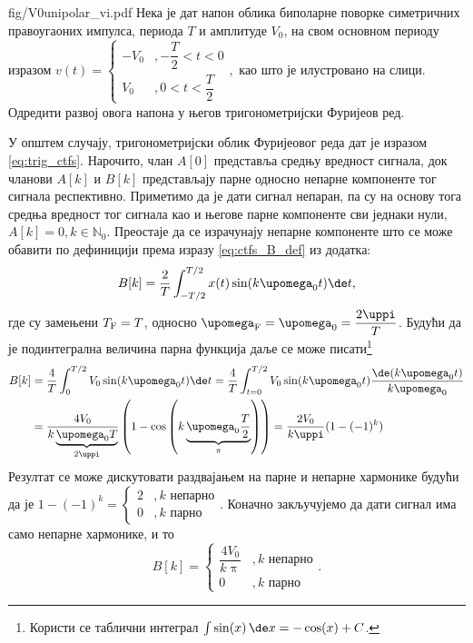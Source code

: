 \noindent\begin{slikaDesno}{fig/V0unipolar_vi.pdf}
\PID \label{z:pravougani_po_def}  Нека је дат напон облика биполарне поворке симетричних правоугаоних импулса, периода $T$ и амплитуде $V_0$, 
на свом основном периоду изразом
$
v(t) = 
\begin{cases}
    -V_0 &, -\dfrac{T}{2} < t < 0 \\[2mm]
    V_0  &, 0 < t < \dfrac{T}{2}
\end{cases},
$ као што је илустровано на слици. Одредити развој овога напона у његов тригонометријски Фуријеов ред.
\end{slikaDesno}
%
\RESENJE
У општем случају, тригонометријски облик Фуријеовог реда дат је изразом \eqref{eq:trig_ctfs}. Нарочито, члан 
$A[0]$ представља средњу вредност сигнала, док чланови $A[k]$ и $B[k]$ представљају парне односно непарне 
компоненте тог сигнала респективно. Приметимо да је дати сигнал непаран, па су на основу тога средња вредност 
тог сигнала као и његове парне компоненте сви једнаки нули, $A[k] = 0, k \in \mathbb N_0$. Преостаје да се 
израчунају непарне компоненте што се може обавити по дефиницији према изразу \eqref{eq:ctfs_B_def} из додатка: 
\begin{eqnarray}
    B[k] = \dfrac{2}{T}\int_{-T/2}^{T/2} x(t) \sin(k\upomega_0 t) \de t, 
\end{eqnarray}
где су замењени $T_{\rm F} = T$, односно $\upomega_{\rm F} = \upomega_0 = \dfrac{2\uppi}{T}$. Будући да је 
подинтегрална величина парна функција даље се  може писати\footnote{Користи се таблични 
интеграл $\int \sin(x)\,\de x = -\cos(x) + C$.}
\begin{align}
    B[k] &= \dfrac{4}{T} \int_0^{T/2} V_0 \sin(k\upomega_0 t) \de t 
         = \dfrac{4}{T} \int_{t = 0}^{T/2} V_0 \sin(k\upomega_0 t) \dfrac{ \de(k \upomega_0 t) }{k \upomega_0} 
         \\
         &= \dfrac{4V_0}{k \underbrace{\upomega_0 T}_{2\uppi}} \left( 1 - \cos\left( k \underbrace{\upomega_0 \dfrac{T}{2}}_{\pi} \right) \right)
         = \dfrac{2V_0}{k\uppi} ( 1 - (-1)^k )
\end{align}
Резултат се може дискутовати раздвајањем на парне и непарне хармонике будући да је 
$1 - (-1)^k = 
\begin{cases}
    2 &, k \text{ непарно} \\
    0 &, k \text{ парно}
\end{cases}$. \vspace*{1mm}
Коначно закључујемо да дати сигнал има само непарне хармонике, и то 
\begin{equation}
B[k] = 
\begin{cases}
    \dfrac{4V_0}{k\uppi} &, k \text{ непарно} \\[2mm]
    0 &, k \text{ парно}
\end{cases}.
\end{equation}
